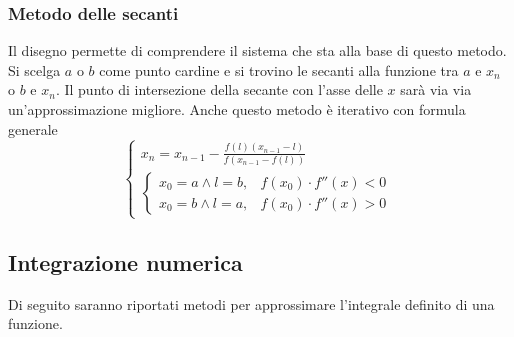 \subsubsection{Metodo delle secanti}
\begin{center}
\end{center}
Il disegno permette di comprendere il sistema che sta alla base di questo metodo. Si scelga $a$ o 
$b$ come punto cardine e si trovino le secanti alla funzione tra $a$ e $x_n$ o $b$ e $x_n$. Il
punto di intersezione della secante con l'asse delle $x$ sarà via via un'approssimazione migliore.
Anche questo metodo è iterativo con formula generale
\begin{equation*}
  \begin{cases}
    x_n=x_{n-1} - \frac{f(l)(x_{n-1}-l)}{f(x_{n-1}-f(l))}\\
    \begin{cases}
      x_0=a\land l=b, & f(x_0)\cdot f''(x) < 0\\
      x_0=b\land l=a, & f(x_0)\cdot f''(x) > 0
    \end{cases}
  \end{cases}
\end{equation*}

\subsection{Integrazione numerica}
Di seguito saranno riportati metodi per approssimare l'integrale definito di una funzione.

